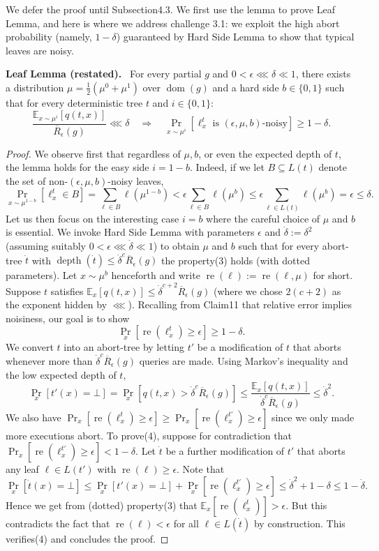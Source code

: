 \documentclass[10pt,a4paper]{article}
\newenvironment{authorclaim}[1]{\par\medskip\noindent\textbf{#1.}\ }{\par\medskip}
\begin{document}
We defer the proof until Subsection4.3. We first use the lemma to prove Leaf Lemma, and here is where we address challenge 3.1: we exploit the high abort probability (namely, $1-\delta$) guaranteed by Hard Side Lemma to show that typical leaves are noisy.
\begin{authorclaim}{Leaf Lemma (restated)}
For every partial $g$ and $0<\epsilon\lll\delta\ll1$, there exists a distribution $\mu=\frac12(\mu^0+\mu^1)$ over $\operatorname{dom}(g)$ and a hard side $b\in\{0,1\}$ such that for every deterministic tree $t$ and $i\in\{0,1\}$:
\[\frac{\mathbb E_{x\sim\mu^i}[q(t,x)]}{\overline R_\epsilon(g)}\lll\delta\quad\Longrightarrow\quad\Pr_{x\sim\mu^i}[\ell_x^t\text{ is }(\epsilon,\mu,b)\text{-noisy}]\ge1-\delta.\]
\end{authorclaim}
\begin{proof}
We observe first that regardless of $\mu,b$, or even the expected depth of $t$, the lemma holds for the easy side $i=1-b$. Indeed, if we let $B\subseteq L(t)$ denote the set of non-$(\epsilon,\mu,b)$-noisy leaves,
\[\Pr_{x\sim\mu^{1-b}}[\ell_x^t\in B]=\sum_{\ell\in B}\ell(\mu^{1-b})<\epsilon\sum_{\ell\in B}\ell(\mu^b)\le\epsilon\sum_{\ell\in L(t)}\ell(\mu^b)=\epsilon\le\delta.\]
Let us then focus on the interesting case $i=b$ where the careful choice of $\mu$ and $b$ is essential. We invoke Hard Side Lemma with parameters $\epsilon$ and $\dot\delta:=\delta^2$ (assuming suitably $0<\epsilon\lll\dot\delta\ll1$) to obtain $\mu$ and $b$ such that for every abort-tree $\dot t$ with $\operatorname{depth}(\dot t)\le\dot\delta^c\overline R_\epsilon(g)$ the property(3) holds (with dotted parameters). Let $x\sim\mu^b$ henceforth and write $\operatorname{re}(\ell):=\operatorname{re}(\ell,\mu)$ for short. Suppose $t$ satisfies $\mathbb E_x[q(t,x)]\le\dot\delta^{c+2}\overline R_\epsilon(g)$ (where we chose $2(c+2)$ as the exponent hidden by $\lll$). Recalling from Claim11 that relative error implies noisiness, our goal is to show
\begin{equation}\tag{4}\Pr_x[\operatorname{re}(\ell_x^t)\ge\epsilon]\ge1-\delta.\end{equation}
We convert $t$ into an abort-tree by letting $t'$ be a modification of $t$ that aborts whenever more than $\dot\delta^c\overline R_\epsilon(g)$ queries are made. Using Markov's inequality and the low expected depth of $t$,
\[\Pr_x[t'(x)=\bot]=\Pr_x[q(t,x)>\dot\delta^c\overline R_\epsilon(g)]\le\frac{\mathbb E_x[q(t,x)]}{\dot\delta^c\overline R_\epsilon(g)}\le\dot\delta^2.\]
We also have $\Pr_x[\operatorname{re}(\ell_x^t)\ge\epsilon]\ge\Pr_x[\operatorname{re}(\ell_x^{t'})\ge\epsilon]$ since we only made more executions abort. To prove(4), suppose for contradiction that $\Pr_x[\operatorname{re}(\ell_x^{t'})\ge\epsilon]<1-\delta$. Let $\dot t$ be a further modification of $t'$ that aborts any leaf $\ell\in L(t')$ with $\operatorname{re}(\ell)\ge\epsilon$. Note that
\[\Pr_x[\dot t(x)=\bot]\le\Pr_x[t'(x)=\bot]+\Pr_x[\operatorname{re}(\ell_x^{t'})\ge\epsilon]\le\dot\delta^2+1-\delta\le1-\dot\delta.\]
Hence we get from (dotted) property(3) that $\mathbb E_x[\operatorname{re}(\ell_x^{\dot t})]>\epsilon$. But this contradicts the fact that $\operatorname{re}(\ell)<\epsilon$ for all $\ell\in L(\dot t)$ by construction. This verifies(4) and concludes the proof.
\end{proof}
\end{document}
